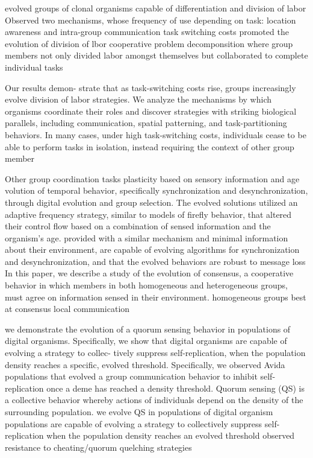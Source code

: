 \citep{goldsby_evolution_2010}
evolved groups of clonal organisms capable of differentiation and  division of labor
Observed two mechanisms, whose frequency of use depending on task: location awareness and intra-group communication
task switching costs promoted the evolution of division of lbor
cooperative problem decomponsition where group members not only divided labor amongst themselves but collaborated to complete individual tasks


\citep{goldsby_task-switching_2012}
Our results demon- strate that as task-switching costs rise, groups increasingly evolve division of labor strategies. We analyze the mechanisms by which organisms coordinate their roles and discover strategies with striking biological parallels, including communication, spatial patterning, and task-partitioning behaviors. In many cases, under high task-switching costs, individuals cease to be able to perform tasks in isolation, instead requiring the context of other group member


Other group coordination tasks 
\citep{knoester_evolution_2011}
plasticity based on sensory information and age
volution of temporal behavior, specifically synchronization and desynchronization, through digital evolution and group selection.
The evolved solutions utilized an adaptive frequency strategy, similar to models of firefly behavior, that altered their control flow based on a combination of sensed information and the organism's age. 
provided with a similar mechanism and minimal information about their environment, are capable of evolving algorithms for synchronization and desynchronization, and that the evolved behaviors are robust
to message loss
\citep{knoester_genetic_2013}
In this paper, we describe a study of the evolution of consensus, a cooperative behavior in which members in both homogeneous and heterogeneous groups, must agree on information sensed in their environment.
homogeneous groups best at consensus
local communication

\citep{beckmann_evolving_2009}
we demonstrate the evolution of a quorum sensing behavior in populations of digital organisms. Specifically, we show that digital organisms are capable of evolving a strategy to collec- tively suppress self-replication, when the population density reaches a specific, evolved threshold.
Specifically, we observed Avida populations that evolved a group communication behavior to inhibit self-replication once a deme has reached a density threshold.
\citep{beckmann_evolution_2012}
Quorum sensing (QS) is a collective behavior whereby actions of individuals depend on the density of the surrounding population.
 we evolve QS in populations of digital organism
populations are capable of evolving a strategy to collectively suppress self-replication when the population density reaches an evolved threshold
observed resistance to cheating/quorum quelching strategies


